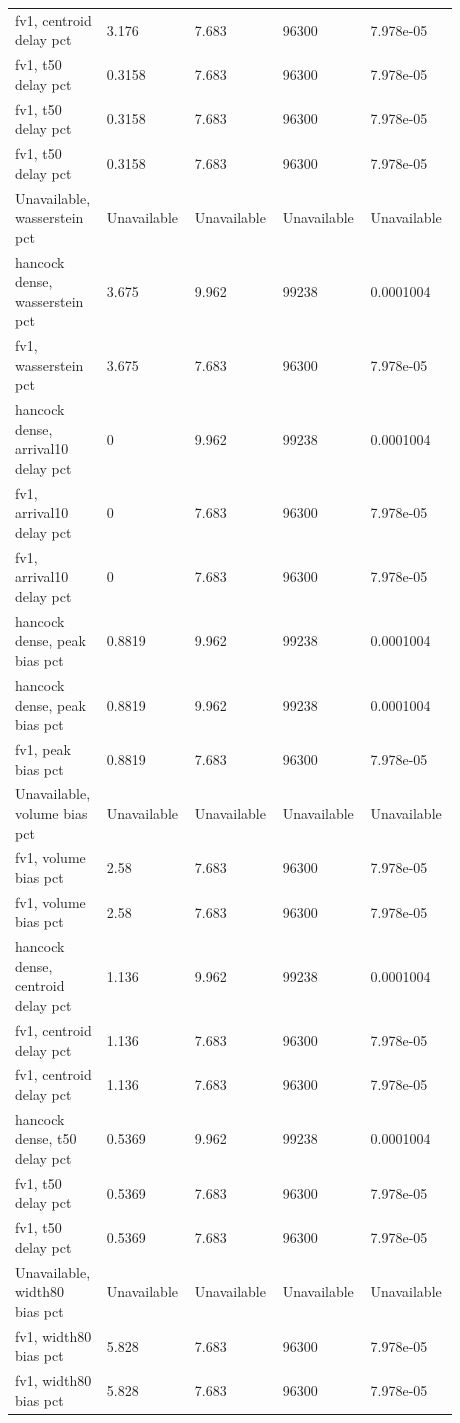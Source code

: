 \begin{longtable}{p{0.1760\linewidth}p{0.1760\linewidth}p{0.1760\linewidth}p{0.1760\linewidth}p{0.1760\linewidth}}
fv1, centroid delay pct & 3.176 & 7.683 & 96300 & 7.978e-05 \\
fv1, t50 delay pct & 0.3158 & 7.683 & 96300 & 7.978e-05 \\
fv1, t50 delay pct & 0.3158 & 7.683 & 96300 & 7.978e-05 \\
fv1, t50 delay pct & 0.3158 & 7.683 & 96300 & 7.978e-05 \\
Unavailable, wasserstein pct & Unavailable & Unavailable & Unavailable & Unavailable \\
hancock dense, wasserstein pct & 3.675 & 9.962 & 99238 & 0.0001004 \\
fv1, wasserstein pct & 3.675 & 7.683 & 96300 & 7.978e-05 \\
hancock dense, arrival10 delay pct & 0 & 9.962 & 99238 & 0.0001004 \\
fv1, arrival10 delay pct & 0 & 7.683 & 96300 & 7.978e-05 \\
fv1, arrival10 delay pct & 0 & 7.683 & 96300 & 7.978e-05 \\
hancock dense, peak bias pct & 0.8819 & 9.962 & 99238 & 0.0001004 \\
hancock dense, peak bias pct & 0.8819 & 9.962 & 99238 & 0.0001004 \\
fv1, peak bias pct & 0.8819 & 7.683 & 96300 & 7.978e-05 \\
Unavailable, volume bias pct & Unavailable & Unavailable & Unavailable & Unavailable \\
fv1, volume bias pct & 2.58 & 7.683 & 96300 & 7.978e-05 \\
fv1, volume bias pct & 2.58 & 7.683 & 96300 & 7.978e-05 \\
hancock dense, centroid delay pct & 1.136 & 9.962 & 99238 & 0.0001004 \\
fv1, centroid delay pct & 1.136 & 7.683 & 96300 & 7.978e-05 \\
fv1, centroid delay pct & 1.136 & 7.683 & 96300 & 7.978e-05 \\
hancock dense, t50 delay pct & 0.5369 & 9.962 & 99238 & 0.0001004 \\
fv1, t50 delay pct & 0.5369 & 7.683 & 96300 & 7.978e-05 \\
fv1, t50 delay pct & 0.5369 & 7.683 & 96300 & 7.978e-05 \\
Unavailable, width80 bias pct & Unavailable & Unavailable & Unavailable & Unavailable \\
fv1, width80 bias pct & 5.828 & 7.683 & 96300 & 7.978e-05 \\
fv1, width80 bias pct & 5.828 & 7.683 & 96300 & 7.978e-05 \\

\end{longtable}
